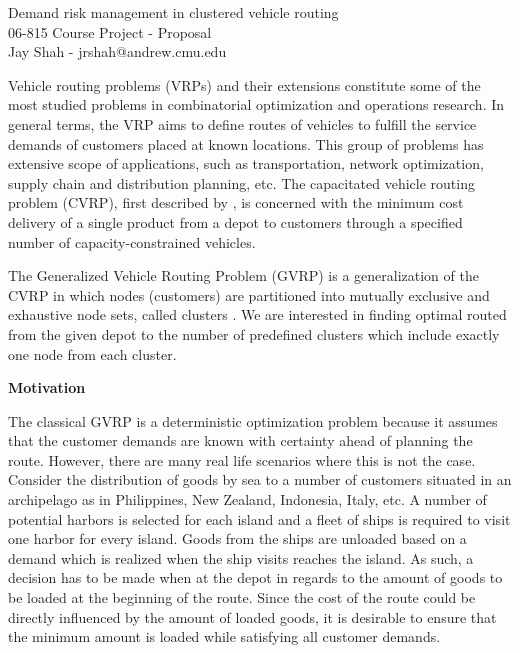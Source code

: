 \documentclass[letterpaper,12pt,onehalfspacing,twoside]{article}
\theoremstyle{msds}
\begin{document}
\pagestyle{plain}

\begingroup  
  \centering
  \LARGE Demand risk management in clustered vehicle routing
  \\ \large 06-815 Course Project - Proposal\\
  \large Jay Shah - jrshah@andrew.cmu.edu\par
\endgroup


Vehicle routing problems (VRPs) and their extensions constitute some of the most studied problems in combinatorial optimization and operations research. In general terms, the VRP aims to define routes of vehicles to fulfill the service demands of customers placed at known locations.  This group of problems has extensive scope of applications, such as transportation, network optimization, supply chain and distribution planning, etc. The capacitated vehicle routing problem (CVRP), first described by \cite{dantzig}, is concerned with the minimum cost delivery of a single product from a depot to customers through a specified number of capacity-constrained vehicles.

The Generalized Vehicle Routing Problem (GVRP) is a generalization of the CVRP in which nodes (customers) are partitioned into mutually exclusive and exhaustive node sets, called clusters \citep{POP201297}. We are interested in finding optimal routed from the given depot to the number of predefined clusters which include exactly one node from each cluster.

\textbf{Motivation}

The classical GVRP is a deterministic optimization problem because it assumes that the customer demands are known with certainty ahead of planning the route. However, there are many real life scenarios where this is not the case. Consider the distribution of goods by sea to a number of customers situated in an archipelago as in Philippines, New Zealand, Indonesia, Italy, etc. A number of potential harbors is selected for each island and a fleet of ships is required to visit one harbor for every island. Goods from the ships are unloaded based on a demand which is realized when the ship visits reaches the island. As such, a decision has to be made when at the depot in regards to the amount of goods to be loaded at the beginning of the route. Since the cost of the route could be directly influenced by the amount of loaded goods, it is desirable to ensure that the minimum amount is loaded while satisfying all customer demands.
\end{document}
